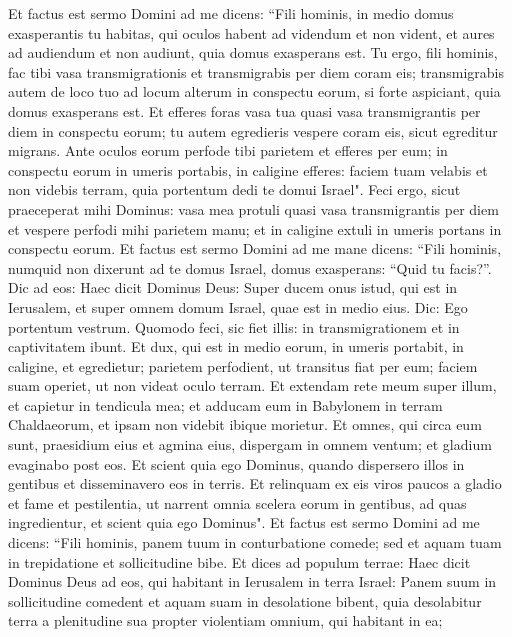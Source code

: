 \begin{biblechapter}  
\verse Et factus est sermo Domini ad me dicens: 
\verse “Fili hominis, in medio domus exasperantis tu habitas, qui oculos habent ad videndum et non vident, et aures ad audiendum et non audiunt, quia domus exasperans est. 
\verse Tu ergo, fili hominis, fac tibi vasa transmigrationis et transmigrabis per diem coram eis; transmigrabis autem de loco tuo ad locum alterum in conspectu eorum, si forte aspiciant, quia domus exasperans est. 
\verse Et efferes foras vasa tua quasi vasa transmigrantis per diem in conspectu eorum; tu autem egredieris vespere coram eis, sicut egreditur migrans. 
\verse Ante oculos eorum perfode tibi parietem et efferes per eum; 
\verse in conspectu eorum in umeris portabis, in caligine efferes: faciem tuam velabis et non videbis terram, quia portentum dedi te domui Israel". 
\verse Feci ergo, sicut praeceperat mihi Dominus: vasa mea protuli quasi vasa transmigrantis per diem et vespere perfodi mihi parietem manu; et in caligine extuli in umeris portans in conspectu eorum. 
\verse Et factus est sermo Domini ad me mane dicens: 
\verse “Fili hominis, numquid non dixerunt ad te domus Israel, domus exasperans: “Quid tu facis?”. 
\verse Dic ad eos: Haec dicit Dominus Deus: Super ducem onus istud, qui est in Ierusalem, et super omnem domum Israel, quae est in medio eius. 
\verse Dic: Ego portentum vestrum. Quomodo feci, sic fiet illis: in transmigrationem et in captivitatem ibunt. 
\verse Et dux, qui est in medio eorum, in umeris portabit, in caligine, et egredietur; parietem perfodient, ut transitus fiat per eum; faciem suam operiet, ut non videat oculo terram. 
\verse Et extendam rete meum super illum, et capietur in tendicula mea; et adducam eum in Babylonem in terram Chaldaeorum, et ipsam non videbit ibique morietur. 
\verse Et omnes, qui circa eum sunt, praesidium eius et agmina eius, dispergam in omnem ventum; et gladium evaginabo post eos. 
\verse Et scient quia ego Dominus, quando dispersero illos in gentibus et disseminavero eos in terris. 
\verse Et relinquam ex eis viros paucos a gladio et fame et pestilentia, ut narrent omnia scelera eorum in gentibus, ad quas ingredientur, et scient quia ego Dominus". 
\verse Et factus est sermo Domini ad me dicens: 
\verse “Fili hominis, panem tuum in conturbatione comede; sed et aquam tuam in trepidatione et sollicitudine bibe. 
\verse Et dices ad populum terrae: Haec dicit Dominus Deus ad eos, qui habitant in Ierusalem in terra Israel: Panem suum in sollicitudine comedent et aquam suam in desolatione bibent, quia desolabitur terra a plenitudine sua propter violentiam omnium, qui habitant in ea; 

\end{biblechapter}

